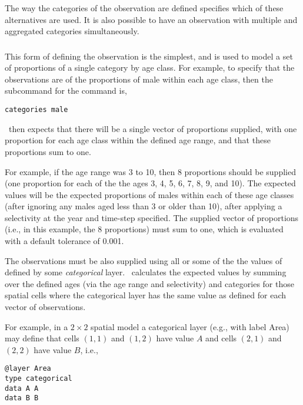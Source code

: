 The way the categories of the observation are defined specifies which of these alternatives are used. It is also possible to have an observation with multiple and aggregated categories simultaneously.

\subsubsection*{}

This form of defining the observation is the simplest, and is used to model a set of proportions of a single category by age class. For example, to specify that the observations are of the proportions of male within each age class, then the subcommand  for the  command is,

{\small{\begin{verbatim}
categories male
\end{verbatim}}}

\SPM\ then expects that there will be a single vector of proportions supplied, with one proportion for each age class within the defined age range, and that these proportions sum to one. 

For example, if the age range was 3 to 10, then 8 proportions should be supplied (one proportion for each of the the ages 3, 4, 5, 6, 7, 8, 9, and 10). The expected values will be the expected proportions of males within each of these age classes (after ignoring any males aged less than 3 or older than 10), after applying a selectivity at the year and time-step specified. The supplied vector of proportions (i.e., in this example, the 8 proportions) must sum to one, which is evaluated with a default tolerance of 0.001. 

The observations must be also supplied using all or some of the the values of defined by some \emph{categorical} layer. \SPM\ calculates the expected values by summing over the defined ages (via the age range and selectivity) and categories for those spatial cells where the categorical layer has the same value as defined for each vector of observations.

For example, in a $2 \times 2$ spatial model a categorical layer (e.g., with label Area) may define that cells $(1,1)$ and $(1,2)$ have value $A$ and cells $(2,1)$ and $(2,2)$ have value $B$, i.e.,

{\small{\begin{verbatim}
@layer Area
type categorical
data A A 
data B B
\end{verbatim}}}

